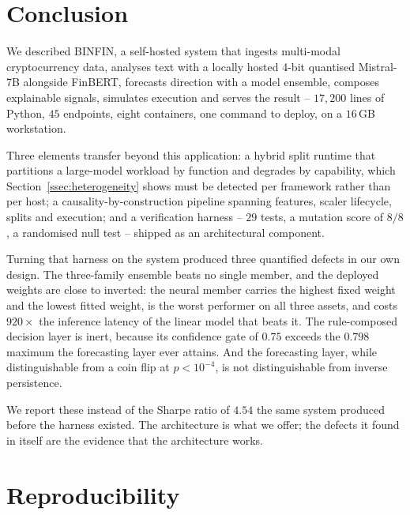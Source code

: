 \documentclass[preprint,12pt,authoryear]{elsarticle}
\begin{document}
\section{Conclusion}
\label{sec:conclusion}

We described BINFIN, a self-hosted system that ingests multi-modal
cryptocurrency data, analyses text with a locally hosted 4-bit quantised
Mistral-7B alongside FinBERT, forecasts direction with a model ensemble,
composes explainable signals, simulates execution and serves the result --
$17{,}200$ lines of Python, $45$ endpoints, eight containers, one command to
deploy, on a $16$\,GB workstation.

Three elements transfer beyond this application: a hybrid split runtime that
partitions a large-model workload by function and degrades by capability, which
Section~\ref{ssec:heterogeneity} shows must be detected per framework rather than
per host; a causality-by-construction pipeline spanning features, scaler
lifecycle, splits and execution; and a verification harness -- $29$ tests, a
mutation score of $8/8$, a randomised null test -- shipped as an architectural
component.

Turning that harness on the system produced three quantified defects in our own
design. The three-family ensemble beats no single member, and the deployed
weights are close to inverted: the neural member carries the highest fixed weight
and the lowest fitted weight, is the worst performer on all three assets, and
costs $920\times$ the inference latency of the linear model that beats it. The
rule-composed decision layer is inert, because its confidence gate of $0.75$
exceeds the $0.798$ maximum the forecasting layer ever attains. And the
forecasting layer, while distinguishable from a coin flip at $p<10^{-4}$, is not
distinguishable from inverse persistence.

We report these instead of the Sharpe ratio of $4.54$ the same system produced
before the harness existed. The architecture is what we offer; the defects it
found in itself are the evidence that the architecture works.

\section*{Reproducibility}
\end{document}
